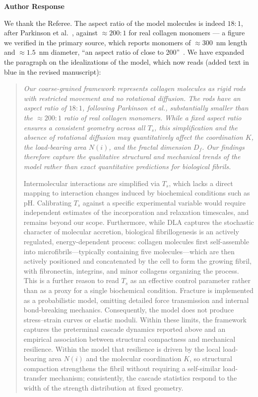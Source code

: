\documentclass[11pt]{article}
\newcommand{\responselabel}{%
  \par\medskip
  {\color{responseblue}\bfseries Author Response}\par
}
\begin{document}
\responselabel

We thank the Referee. The aspect ratio of the model molecules is indeed $18{:}1$,
after Parkinson et al.~\cite{Parkinson1997}, against $\approx 200{:}1$ for real
collagen monomers --- a figure we verified in the primary source, which reports
monomers of $\approx 300$~nm length and $\approx 1.5$~nm diameter, ``an aspect
ratio of close to 200''~\cite{Buehler2008b}. We have expanded the paragraph on
the idealizations of the model, which now reads (added text in blue in the
revised manuscript):

\begin{quotation}\itshape
Our coarse-grained framework represents collagen molecules as rigid rods with
restricted movement and no rotational diffusion. The rods have an aspect ratio
of $18{:}1$, following Parkinson et al., substantially smaller than the
$\approx 200{:}1$ ratio of real collagen monomers. While a fixed aspect ratio
ensures a consistent geometry across all $T_s$, this simplification and the
absence of rotational diffusion may quantitatively affect the coordination $K$,
the load-bearing area $N(i)$, and the fractal dimension $D_f$. Our findings
therefore capture the qualitative structural and mechanical trends of the model
rather than exact quantitative predictions for biological fibrils.

Intermolecular interactions are simplified via $T_s$, which lacks a direct
mapping to interaction changes induced by biochemical conditions such as pH.
Calibrating $T_s$ against a specific experimental variable would require
independent estimates of the incorporation and relaxation timescales, and
remains beyond our scope. Furthermore, while DLA captures the stochastic
character of molecular accretion, biological fibrillogenesis is an actively
regulated, energy-dependent process: collagen molecules first self-assemble into
microfibrils---typically containing five molecules---which are then actively
positioned and concatenated by the cell to form the growing fibril, with
fibronectin, integrins, and minor collagens organizing the process. This is a
further reason to read $T_s$ as an effective control parameter rather than as a
proxy for a single biochemical condition. Fracture is implemented as a
probabilistic model, omitting detailed force transmission and internal
bond-breaking mechanics. Consequently, the model does not produce
stress--strain curves or elastic moduli. Within these limits, the framework
captures the preterminal cascade dynamics reported above and an empirical
association between structural compactness and mechanical resilience. Within the
model that resilience is driven by the local load-bearing area $N(i)$ and the
molecular coordination $K$, so structural compaction strengthens the fibril
without requiring a self-similar load-transfer mechanism; consistently, the
cascade statistics respond to the width of the strength distribution at fixed
geometry.
\end{quotation}
\end{document}
